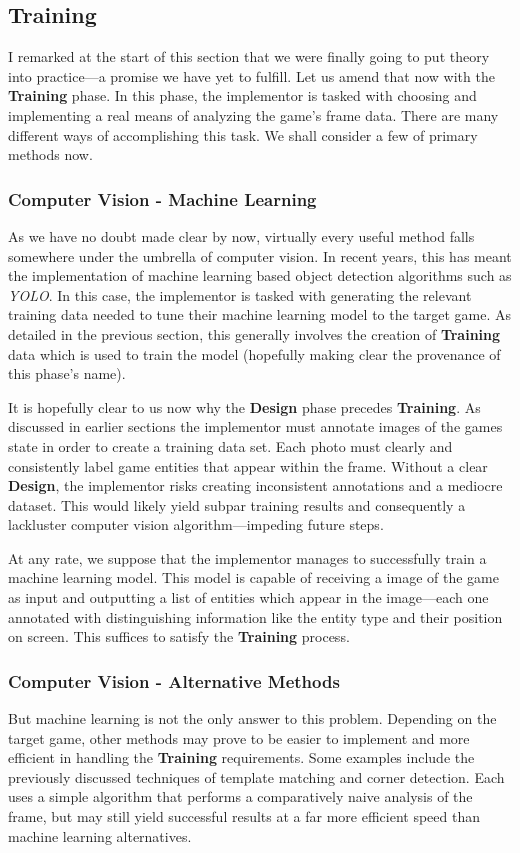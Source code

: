 \documentclass{report}
\newcommand{\train}{\textbf{Training}\xspace}
\newcommand{\design}{\textbf{Design}\xspace}
\newcommand{\imp}{implementor\xspace}
\begin{document}
\subsection{Training}

I remarked at the start of this section that we were finally going to put theory into practice---a promise we have yet to fulfill. Let us amend that now with the \train phase. In this phase, the \imp is tasked with choosing and implementing a real means of analyzing the game's frame data. There are many different ways of accomplishing this task. We shall consider a few of primary methods now.   

\subsubsection{Computer Vision - Machine Learning}
As we have no doubt made clear by now, virtually every useful method falls somewhere under the umbrella of computer vision. In recent years, this has meant the implementation of machine learning based object detection algorithms such as \emph{YOLO}. In this case, the implementor is tasked with generating the relevant training data needed to tune their machine learning model to the target game. As detailed in the previous section, this generally involves the creation of \train data which is used to train the model (hopefully making clear the provenance of this phase's name).

It is hopefully clear to us now why the \design phase precedes \train. As discussed in earlier sections the \imp must annotate images of the games state in order to create a training data set. Each photo must clearly and consistently label game entities that appear within the frame. Without a clear \design, the \imp risks creating inconsistent annotations and a mediocre dataset. This would likely yield subpar training results and consequently a lackluster computer vision algorithm---impeding future steps.

At any rate, we suppose that the \imp manages to successfully train a machine learning model. This model is capable of receiving a image of the game as input and outputting a list of entities which appear in the image---each one annotated with distinguishing information like the entity type and their position on screen. This suffices to satisfy the \train process. 

\subsubsection{Computer Vision - Alternative Methods}
But machine learning is not the only answer to this problem. Depending on the target game, other methods may prove to be easier to implement and more efficient in handling the \train requirements. Some examples include the previously discussed techniques of template matching and corner detection. Each uses a simple algorithm that performs a comparatively naive analysis of the frame, but may still yield successful results at a far more efficient speed than machine learning alternatives.
\end{document}
